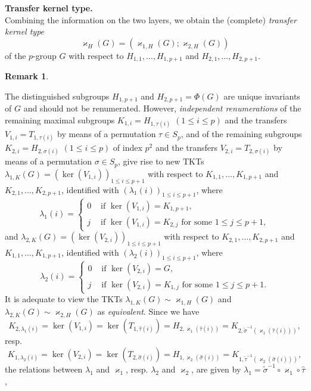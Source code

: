 \documentclass{amsart}
\theoremstyle{definition}
\newtheorem{remark}{Remark}[section]
\numberwithin{equation}{section}
\begin{document}
\noindent
\textbf{Transfer kernel type.}\\
Combining the information on the two layers,
we obtain the (complete) \textit{transfer kernel type}
\[\varkappa_{H}(G)=(\varkappa_{1,H}(G);\varkappa_{2,H}(G))\]
of the \(p\)-group \(G\) with respect to \(H_{1,1},\ldots,H_{1,p+1}\) and \(H_{2,1},\ldots,H_{2,p+1}\).

\begin{remark}
\label{rmk:OrbitTypePe2Pe}

The distinguished subgroups \(H_{1,p+1}\) and \(H_{2,p+1}=\Phi(G)\) are unique invariants of \(G\)
and should not be renumerated.
However, \textit{independent renumerations}
of the remaining maximal subgroups \(K_{1,i}=H_{1,\tau(i)}\) \((1\le i\le p)\)
and the transfers \(V_{1,i}=T_{1,\tau(i)}\)
by means of a permutation \(\tau\in S_p\),
and of the remaining subgroups \(K_{2,i}=H_{2,\sigma(i)}\) \((1\le i\le p)\) of index \(p^2\)
and the transfers \(V_{2,i}=T_{2,\sigma(i)}\)
by means of a permutation \(\sigma\in S_p\),
give rise to new TKTs
\(\lambda_{1,K}(G)=(\ker(V_{1,i}))_{1\le i\le p+1}\)
with respect to \(K_{1,1},\ldots,K_{1,p+1}\) and \(K_{2,1},\ldots,K_{2,p+1}\),
identified with \((\lambda_1(i))_{1\le i\le p+1}\), where
\[\lambda_1(i)=
\begin{cases}
0 & \text{ if } \ker(V_{1,i})=K_{1,p+1},\\
j & \text{ if } \ker(V_{1,i})=K_{2,j} \text{ for some } 1\le j\le p+1,
\end{cases}\]
and
\(\lambda_{2,K}(G)=(\ker(V_{2,i}))_{1\le i\le p+1}\)
with respect to \(K_{2,1},\ldots,K_{2,p+1}\) and \(K_{1,1},\ldots,K_{1,p+1}\),
identified with \((\lambda_2(i))_{1\le i\le p+1}\), where
\[\lambda_2(i)=
\begin{cases}
0 & \text{ if } \ker(V_{2,i})=G,\\
j & \text{ if } \ker(V_{2,i})=K_{1,j} \text{ for some } 1\le j\le p+1.
\end{cases}\]
It is adequate to view the TKTs
\(\lambda_{1,K}(G)\sim\varkappa_{1,H}(G)\) and \(\lambda_{2,K}(G)\sim\varkappa_{2,H}(G)\)
as \textit{equivalent}.
Since we have
\[K_{2,\lambda_1(i)}=\ker(V_{1,i})=\ker(T_{1,\hat{\tau}(i)})=
H_{2,\varkappa_1(\hat{\tau}(i))}=K_{2,\tilde{\sigma}^{-1}(\varkappa_1(\hat{\tau}(i)))},\]
resp.
\[K_{1,\lambda_2(i)}=\ker(V_{2,i})=\ker(T_{2,\hat{\sigma}(i)})=
H_{1,\varkappa_2(\hat{\sigma}(i))}=K_{1,\tilde{\tau}^{-1}(\varkappa_2(\hat{\sigma}(i)))},\]
the relations between \(\lambda_1\) and \(\varkappa_1\), resp. \(\lambda_2\) and \(\varkappa_2\),
are given by \(\lambda_1=\tilde{\sigma}^{-1}\circ\varkappa_1\circ\hat{\tau}\),

\end{remark}
\end{document}
